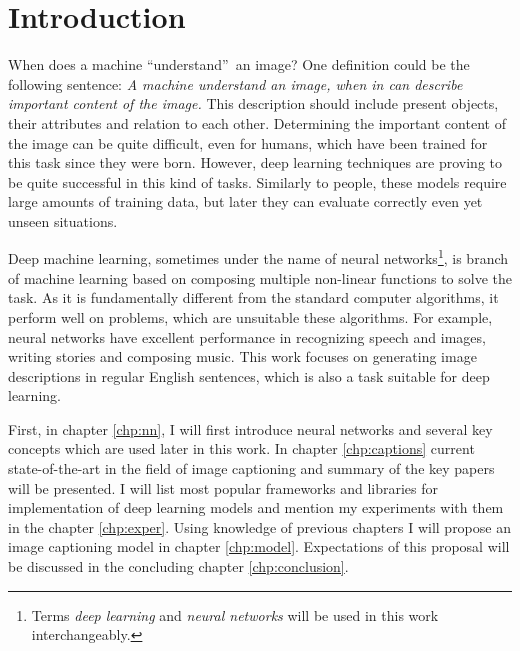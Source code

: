 
\chapter{Introduction}


When does a machine \textquotedblleft understand\textquotedblright\ an image? One definition could be the following sentence: \emph{A machine understand an image, when in can describe important content of the image.} This description should include present objects, their attributes and relation to each other. Determining the important content of the image can be quite difficult, even for humans, which have been trained for this task since they were born. However, deep learning techniques are proving to be quite successful in this kind of tasks. Similarly to people, these models require large amounts of training data, but later they can evaluate correctly even yet unseen situations.

Deep machine learning, sometimes under the name of neural networks\footnote{Terms \emph{deep learning} and \emph{neural networks} will be used in this work interchangeably.}, is branch of machine learning based on composing multiple non-linear functions to solve the task. As it is fundamentally different from the standard computer algorithms, it perform well on problems, which are unsuitable these algorithms. For example, neural networks have excellent performance in recognizing speech and images, writing stories and composing music. This work focuses on generating image descriptions in regular English sentences, which is also a task suitable for deep learning.

First, in chapter \ref{chp:nn}, I will first introduce neural networks and several key concepts which are used later in this work. In chapter \ref{chp:captions} current state-of-the-art in the field of image captioning and summary of the key papers will be presented. I will list most popular frameworks and libraries for implementation of deep learning models and mention my experiments with them in the chapter \ref{chp:exper}. Using knowledge of previous chapters I will propose an image captioning model in chapter \ref{chp:model}. Expectations of this proposal will be discussed in the concluding chapter \ref{chp:conclusion}.



